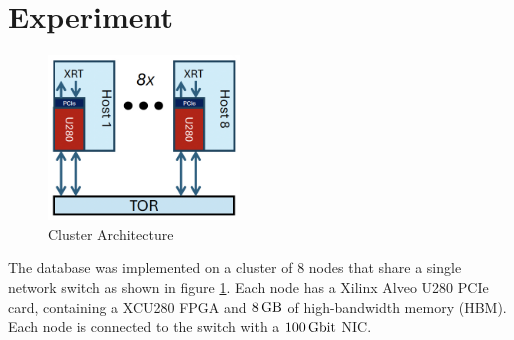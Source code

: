 \section{Experiment}

\begin{figure}
	\includegraphics[width=2in]{oct-arch.jpg}
	\caption{Cluster Architecture}
	\label{oct-arch}
\end{figure}

The database was implemented on a cluster of 8 nodes that share a single network switch as shown in figure \ref{oct-arch}. Each node has a Xilinx Alveo U280 PCIe card, containing a XCU280 FPGA and $\SI{8}{\giga\byte}$ of high-bandwidth memory (HBM). Each node is connected to the switch with a $\SI{100}{\giga\bit}$ NIC.
